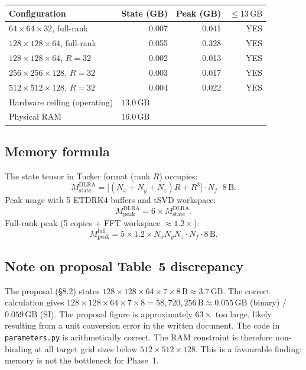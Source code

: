 \documentclass[11pt, a4paper]{article}
\begin{document}
\begin{center}
\begin{tabular}{lrrr}
\toprule
Configuration & State (GB) & Peak (GB) & $\leq 13\,\text{GB}$ \\
\midrule
$64\times64\times32$, full-rank     & 0.007 & 0.041 & YES \\
$128\times128\times64$, full-rank   & 0.055 & 0.328 & YES \\
$128\times128\times64$, $R=32$      & 0.002 & 0.013 & YES \\
$256\times256\times128$, $R=32$     & 0.003 & 0.017 & YES \\
$512\times512\times128$, $R=32$     & 0.004 & 0.022 & YES \\
\midrule
Hardware ceiling (operating) & \multicolumn{3}{l}{$13.0\,\text{GB}$} \\
Physical RAM & \multicolumn{3}{l}{$16.0\,\text{GB}$} \\
\bottomrule
\end{tabular}
\end{center}

\subsection{Memory formula}

The state tensor in Tucker format (rank $R$) occupies:
\[
  M_\text{state}^\text{DLRA}
  = \bigl[(N_x + N_y + N_z)R + R^3\bigr] \cdot N_f \cdot 8\,\text{B}.
\]
Peak usage with 5 ETDRK4 buffers and tSVD workspace:
\[
  M_\text{peak}^\text{DLRA} = 6 \times M_\text{state}^\text{DLRA}.
\]
Full-rank peak (5 copies + FFT workspace $\approx 1.2\times$):
\[
  M_\text{peak}^\text{full} = 5 \times 1.2 \times N_x N_y N_z \cdot N_f \cdot 8\,\text{B}.
\]

\subsection{Note on proposal Table~5 discrepancy}
\label{sec:d3-note}

The proposal (\S8.2) states $128\times128\times64 \times 7 \times 8\,\text{B}
\approx 3.7\,\text{GB}$.  The correct calculation gives
$128\times128\times64\times7\times8 = 58{,}720{,}256\,\text{B} \approx 0.055\,\text{GB}$
(binary) / $0.059\,\text{GB}$ (SI).  The proposal figure is approximately $63\times$ too
large, likely resulting from a unit conversion error in the written document.
The code in \texttt{parameters.py} is arithmetically correct.
The RAM constraint is therefore non-binding at all target grid sizes
below $512\times512\times128$.  This is a favourable finding: memory is
not the bottleneck for Phase~1.
\end{document}
